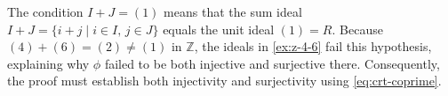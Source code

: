 \begin{content}

\begin{steps}
The condition $I + J = (1)$ means that the sum ideal $I + J = \{i + j \mid i \in I,\, j \in J\}$ equals the unit ideal $(1) = R$. Because $(4) + (6) = (2) \neq (1)$ in $\mathbb{Z}$, the ideals in \cref{ex:z-4-6} fail this hypothesis, explaining why $\phi$ failed to be both injective and surjective there. Consequently, the proof must establish both injectivity and surjectivity using \eqref{eq:crt-coprime}.
\end{steps}
\end{content}

\begin{hidden}
\end{hidden}

